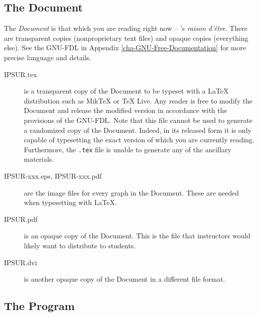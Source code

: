 \subsection*{The Document}

The \emph{Document} is that which you are reading right now -- \IPSUR's \emph{raison d'\^etre}. There are transparent copies (nonproprietary text files) and opaque copies (everything else). See the GNU-FDL in Appendix \ref{cha-GNU-Free-Documentation} for more precise language and details.

\begin{description}
\item[IPSUR.tex] is a transparent copy of the Document to be typeset with a \LaTeX{} distribution such as MikTeX or \TeX{} Live. Any reader is free to modify the Document and release the modified version in accordance with the provisions of the GNU-FDL. Note that this file cannot be used to generate a randomized copy of the Document. Indeed, in its released form it is only capable of typesetting the exact version of \IPSUR which you are currently reading. Furthermore, the \texttt{.tex} file is unable to generate any of the ancillary materials.
\item[IPSUR-xxx.eps, IPSUR-xxx.pdf] are the image files for every graph in the Document. These are needed when typesetting with \LaTeX{}.
\item[IPSUR.pdf] is an opaque copy of the Document. This is the file that instructors would likely want to distribute to students.
\item[IPSUR.dvi] is another opaque copy of the Document in a different file format.
\end{description}

\subsection*{The Program}


